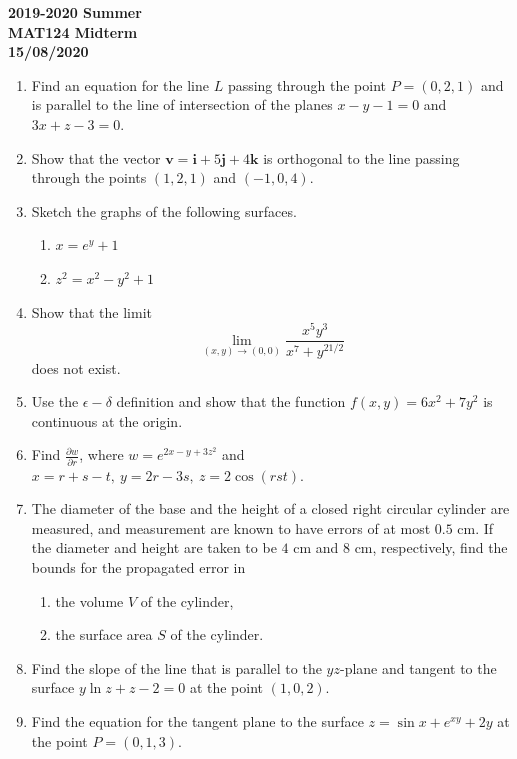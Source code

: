 \documentclass[a4paper, 12pt]{article}
\begin{document}
\pagestyle{empty}

\begin{center}
\textbf{2019-2020 Summer\\MAT124 Midterm\\15/08/2020}
\end{center}

\begin{enumerate}[leftmargin=*,label=\textbf{\arabic*.}]
\item Find an equation for the line $L$ passing through the point $P=(0,2,1)$ and is parallel to the line of intersection of the planes $x-y-1=0$ and $3x+z-3=0$.

\item Show that the vector $\mathbf{v}=\mathbf{i}+5\mathbf{j}+4\mathbf{k}$ is orthogonal to the line passing through the points $(1,2,1)$ and $(-1,0,4)$.

\item Sketch the graphs of the following surfaces.
\begin{enumerate}[leftmargin=*,label=\textbf{\alph*.}]
\item $x={e}^y+1$
\item $z^2=x^2-y^2+1$
\end{enumerate}

\item Show that the limit
\[\lim_{(x,y)\to(0,0)}\frac{x^5y^3}{x^7+y^{21/2}}\]
does not exist.

\item Use the $\epsilon-\delta$ definition and show that the function $f(x,y)=6x^2+7y^2$ is continuous at the origin.

\item Find $\displaystyle\frac{\partial w}{\partial r}$, where $w={e}^{2x-y+3z^2}$ and $x=r+s-t,\:y=2r-3s,\:z=2\cos(rst)$.

\item The diameter of the base and the height of a closed right circular cylinder are measured, and measurement are known to have errors of at most $0.5$ cm. If the diameter and height are taken to be $4$ cm and $8$ cm, respectively, find the bounds for the propagated error in
\begin{enumerate}[leftmargin=*,label=\textbf{\alph*.}]
\item the volume $V$ of the cylinder,
\item the surface area $S$ of the cylinder.
\end{enumerate}

\item Find the slope of the line that is parallel to the $yz$-plane and tangent to the surface $y\ln z+z-2=0$ at the point $(1,0,2)$.

\item Find the equation for the tangent plane to the surface $z=\sin x+{e}^{xy}+2y$ at the point $P=(0,1,3)$.
\end{enumerate}
\end{document}
